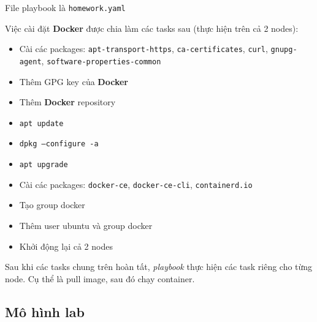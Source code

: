 \documentclass{article}
\begin{document}
\par File playbook là \texttt{homework.yaml}

\par Việc cài đặt \textbf{Docker} được chia làm các tasks sau (thực hiện trên cả 2 nodes):

\begin{itemize}
    \item Cài các packages: \texttt{apt-transport-https}, \texttt{ca-certificates}, \texttt{curl}, \texttt{gnupg-agent}, \texttt{software-properties-common}
    \item Thêm GPG key của \textbf{Docker}
    \item Thêm \textbf{Docker} repository
    \item \texttt{apt update}
    \item \texttt{dpkg --configure -a}
    \item \texttt{apt upgrade}
    \item Cài các packages: \texttt{docker-ce}, \texttt{docker-ce-cli}, \texttt{containerd.io}
    \item Tạo group docker
    \item Thêm user ubuntu và group docker
    \item Khởi động lại cả 2 nodes
\end{itemize}

\par Sau khi các tasks chung trên hoàn tất, \textit{playbook} thực hiện các task riêng cho từng node. Cụ thể là pull image, sau đó chạy container.

\newpage
\subsection{Mô hình lab}
\end{document}
